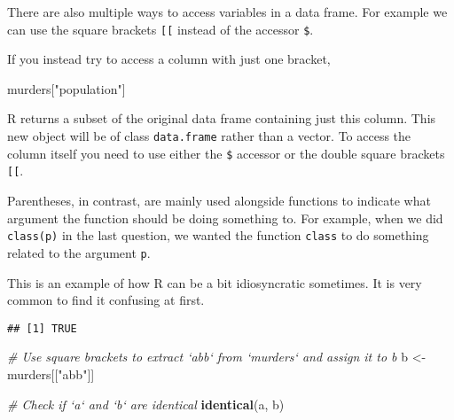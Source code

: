 \documentclass[
]{article}
\newenvironment{Shaded}{\begin{snugshade}}{\end{snugshade}}
\newcommand{\CommentTok}[1]{\textcolor[rgb]{0.56,0.35,0.01}{\textit{#1}}}
\newcommand{\KeywordTok}[1]{\textcolor[rgb]{0.13,0.29,0.53}{\textbf{#1}}}
\newcommand{\NormalTok}[1]{#1}
\newcommand{\OperatorTok}[1]{\textcolor[rgb]{0.81,0.36,0.00}{\textbf{#1}}}
\newcommand{\StringTok}[1]{\textcolor[rgb]{0.31,0.60,0.02}{#1}}
\begin{document}
There are also multiple ways to access variables in a data frame. For
example we can use the square brackets \texttt{{[}{[}} instead of the
accessor \texttt{\$}.

If you instead try to access a column with just one bracket,

\begin{Shaded}
\begin{Highlighting}[]
\NormalTok{murders[}\StringTok{"population"}\NormalTok{]}
\end{Highlighting}
\end{Shaded}

R returns a subset of the original data frame containing just this
column. This new object will be of class \texttt{data.frame} rather than
a vector. To access the column itself you need to use either the
\texttt{\$} accessor or the double square brackets \texttt{{[}{[}}.

Parentheses, in contrast, are mainly used alongside functions to
indicate what argument the function should be doing something to. For
example, when we did \texttt{class(p)} in the last question, we wanted
the function \texttt{class} to do something related to the argument
\texttt{p}.

This is an example of how R can be a bit idiosyncratic sometimes. It is
very common to find it confusing at first.

\begin{Shaded}
\end{Shaded}

\begin{verbatim}
## [1] TRUE
\end{verbatim}

\begin{Shaded}
\begin{Highlighting}[]
\CommentTok{# Use square brackets to extract `abb` from `murders` and assign it to b}
\NormalTok{b <-}\StringTok{ }\NormalTok{murders[[}\StringTok{"abb"}\NormalTok{]]}

\CommentTok{# Check if `a` and `b` are identical }
\KeywordTok{identical}\NormalTok{(a, b)}
\end{Highlighting}
\end{Shaded}
\end{document}
